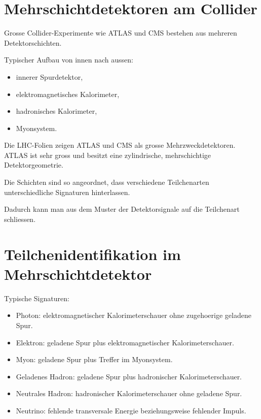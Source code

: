 \section{Mehrschichtdetektoren am Collider}

Grosse Collider-Experimente wie ATLAS und CMS bestehen aus mehreren Detektorschichten.

\begin{conceptbox}
Typischer Aufbau von innen nach aussen:
\begin{itemize}
    \item innerer Spurdetektor,
    \item elektromagnetisches Kalorimeter,
    \item hadronisches Kalorimeter,
    \item Myonsystem.
\end{itemize}
\end{conceptbox}

\begin{notebox}
Die LHC-Folien zeigen ATLAS und CMS als grosse Mehrzweckdetektoren.
ATLAS ist sehr gross und besitzt eine zylindrische, mehrschichtige Detektorgeometrie.
\end{notebox}

\begin{conceptbox}
Die Schichten sind so angeordnet, dass verschiedene Teilchenarten unterschiedliche
Signaturen hinterlassen.

Dadurch kann man aus dem Muster der Detektorsignale auf die Teilchenart schliessen.
\end{conceptbox}

\section{Teilchenidentifikation im Mehrschichtdetektor}

\begin{notebox}
Typische Signaturen:
\begin{itemize}
    \item Photon: elektromagnetischer Kalorimeterschauer ohne zugehoerige geladene Spur.
    \item Elektron: geladene Spur plus elektromagnetischer Kalorimeterschauer.
    \item Myon: geladene Spur plus Treffer im Myonsystem.
    \item Geladenes Hadron: geladene Spur plus hadronischer Kalorimeterschauer.
    \item Neutrales Hadron: hadronischer Kalorimeterschauer ohne geladene Spur.
    \item Neutrino: fehlende transversale Energie beziehungsweise fehlender Impuls.
\end{itemize}
\end{notebox}

